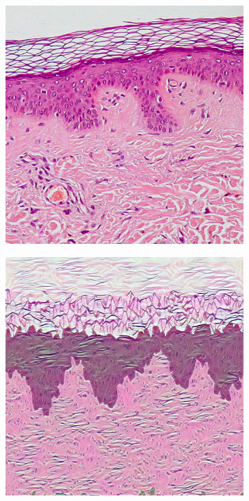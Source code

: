 \documentclass[12pt,a4paper]{report}
\begin{document}
\begin{description}
\begin{figure}
\begin{subfigure}[t]{0.3\textwidth}
                 \includegraphics[width = \textwidth]{images/st_nn5}
                 \caption{}
                 \label{fig:st_nn5}
            \end{subfigure}
            \quad
            \begin{subfigure}[t]{0.3\textwidth}
                 \centering
                 \includegraphics[width = \textwidth]{images/st_nn6}

\end{subfigure}
\end{figure}
\end{description}
\end{document}
